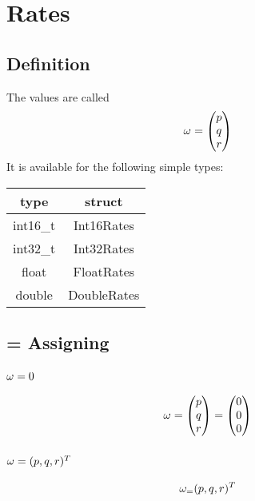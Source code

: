 \section{Rates}
\subsection{Definition}
The values are called
\begin{equation}
\ra{} = \begin{pmatrix} p \\q\\r\end{pmatrix}
\end{equation}
It is available for the following simple types:\\
\begin{tabular}{c|c}
type		& struct		\\ \hline
int16\_t	& Int16Rates	\\
int32\_t	& Int32Rates	\\
float 		& FloatRates	\\
double 		& DoubleRates
\end{tabular}

\subsection{= Assigning}
\subsubsection*{$\ra{} = 0$}
\begin{equation}
\ra{} = \begin{pmatrix}p\\q\\r\end{pmatrix} = \begin{pmatrix}0\\0\\0\end{pmatrix}
\end{equation}

\subsubsection*{$\ra{} = \transp{(p, q, r)}$}
\begin{equation}
\ra = \transp{(p, q, r)}
\end{equation}

